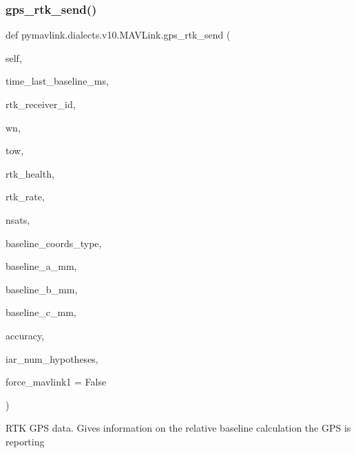 \begin{DoxyVerb}
\begin{DoxyVerb}
\subsubsection{\texorpdfstring{gps\+\_\+rtk\+\_\+send()}{gps\_rtk\_send()}}
{\footnotesize\ttfamily def pymavlink.\+dialects.\+v10.\+M\+A\+V\+Link.\+gps\+\_\+rtk\+\_\+send (\begin{DoxyParamCaption}\item[{}]{self,  }\item[{}]{time\+\_\+last\+\_\+baseline\+\_\+ms,  }\item[{}]{rtk\+\_\+receiver\+\_\+id,  }\item[{}]{wn,  }\item[{}]{tow,  }\item[{}]{rtk\+\_\+health,  }\item[{}]{rtk\+\_\+rate,  }\item[{}]{nsats,  }\item[{}]{baseline\+\_\+coords\+\_\+type,  }\item[{}]{baseline\+\_\+a\+\_\+mm,  }\item[{}]{baseline\+\_\+b\+\_\+mm,  }\item[{}]{baseline\+\_\+c\+\_\+mm,  }\item[{}]{accuracy,  }\item[{}]{iar\+\_\+num\+\_\+hypotheses,  }\item[{}]{force\+\_\+mavlink1 = {\ttfamily False} }\end{DoxyParamCaption})}

\begin{DoxyVerb}RTK GPS data. Gives information on the relative baseline calculation
the GPS is reporting


\end{DoxyVerb}
\end{DoxyVerb}
\end{DoxyVerb}
